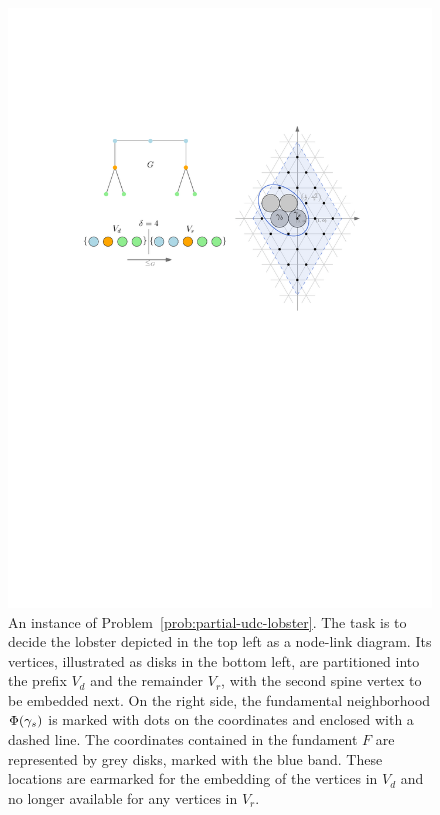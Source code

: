 \begin{figure}
    \centering
    \includegraphics{graphics/ch4_partialproblem.pdf}
    \caption{An instance of Problem~\ref{prob:partial-udc-lobster}. The task is to decide the lobster depicted in the top left as a node-link diagram. Its vertices, illustrated as disks in the bottom left, are partitioned into the prefix $V_d$ and the remainder $V_r$, with the second spine vertex to be embedded next.
    On the right side, the fundamental neighborhood $\Phi(\gamma_s)$ is marked with dots on the coordinates and enclosed with a dashed line. The coordinates contained in the fundament $F$ are represented by grey disks, marked with the blue band. These locations are earmarked for the embedding of the vertices in $V_d$ and no longer available for any vertices in $V_r$.}
    \label{fig:ch4_partialproblem}
\end{figure}

